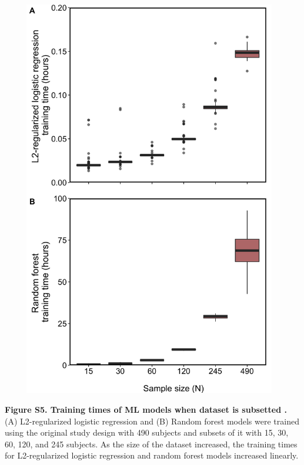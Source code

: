 \documentclass[11pt,]{article}
\begin{document}
\includegraphics[height=17.5cm, width=13cm]{Figure_S5.png}

\textbf{Figure S5. Training times of ML models when dataset is subsetted
.} (A) L2-regularized logistic regression and (B) Random forest models
were trained using the original study design with 490 subjects and
subsets of it with 15, 30, 60, 120, and 245 subjects. As the size of the
dataset increased, the training times for L2-regularized logistic
regression and random forest models increased linearly.

\newpage

\small
\end{document}
